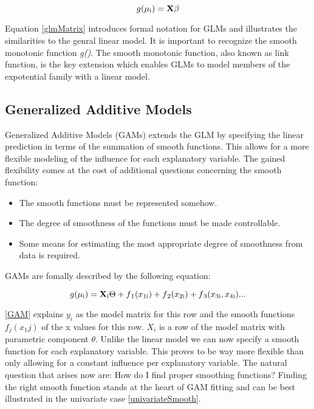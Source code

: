 \documentclass{article}
\begin{document}
    \begin{equation} \label{glmMatrix} g(\mu\textsubscript{i}) = \mathbf{X} \beta \end{equation}

    Equation \ref{glmMatrix} introduces formal notation for GLMs and illustrates the similarities to the genral linear model. It is important to recognize the smooth monotonic function \textit{g()}. The smooth monotonic function, also known as link function, is the key extension which enables GLMs to model members of the expotential family with a linear model.

    \subsection{Generalized Additive Models}
    Generalized Additive Models (GAMs) extends the GLM by specifying the linear prediction in terms of the summation of smooth functions. This allows for a more flexible modeling of the influence for each explanatory variable. The gained flexibility comes at the cost of additional questions concerning the smooth function:

    \begin{itemize}
        \item The smooth functions must be represented somehow.
        \item The degree of smoothness of the functions must be made controllable.
        \item Some means for estimating the most appropriate degree of smoothness from data is required.
    \end{itemize}

    GAMs are fomally described by the following equation:

    \begin{equation} \label{GAM} g(\mu\textsubscript{i}) = \mathbf{X} \textsubscript{i} \Theta + f\textsubscript{1}(x\textsubscript{1i}) + f\textsubscript{2}(x\textsubscript{2i}) + f\textsubscript{3}(x\textsubscript{3i}, x\textsubscript{4i}) ... \end{equation}

    \ref{GAM} explains $y_i$ as the model matrix for this row and the smooth functions $f_j(x_1j)$ of the x values for this row. $X_i$ is a row of the model matrix with parametric component $\theta$. Unlike the linear model we can now  specify a smooth function for each explanatory variable. This proves to be way more flexible than only allowing for a constant influence per explanatory variable. The natural question that arises now are: How do I find proper smoothing functions? Finding the right smooth function stands at the heart of GAM fitting and can be best illustrated in the univariate case \ref{univariateSmooth}.
\end{document}
